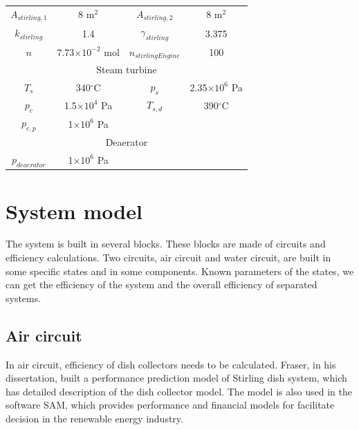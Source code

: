 \documentclass{article}
\begin{document}
\begin{table}[htbp]
\begin{center}
\begin{tabular}{cccc}
		$A_{stirling,1}$\nomenclature{$A_{stirling,1}$}{Heat transfer area of Stirling engine at air side, m$^2$} & 8 m$^2$ & $A_{stirling,2}$\nomenclature{$A_{stirling,2}$}{Heat transfer area of Stirling engine at water side, m$^2$} & 8 m$^2$\\
		$k_{stirling}$\nomenclature{$k_{stirling}$}{Specific heat ratio of the working gas in Stirling engine} & 1.4 & $\gamma_{stirling}$\nomenclature[G]{$\gamma_{stirling}$}{Compression ratio of Stirling engine} & 3.375\\
		$n$\nomenclature{$n$}{Amount of working gas in each Stirling engine, mol} & 7.73$\times{}10^{-2}$ mol & $n_{stirlingEngine}$\nomenclature{$n_{stirlingEngine}$}{Number of Stirling engines in the Stirling engine array} & 100\\
		\midrule
		\multicolumn{4}{c}{Steam turbine}\\
		\midrule
		$T_s$\nomenclature{$T_s$}{Main steam temperature of turbine} & 340$^\circ$C & $p_s$\nomenclature{$p_s$}{Main steam pressure of turbine, Pa} & 2.35$\times10^6$ Pa\\
		$p_c$\nomenclature{$p_c$}{Exhaust pressure of turbine, Pa} & 1.5$\times10^4$ Pa & $T_{s,d}$\nomenclature{$T_{s,d}$}{Designed mean steam temperature of turbine} & 390$^\circ$C\\
		$p_{c,p}$\nomenclature{$p_{cp}$}{Water pressure after condensate pump, Pa} & 1$\times10^6$ Pa\\
		\midrule
		\multicolumn{4}{c}{Deaerator}\\
		\midrule
		$p_{deaerator}$\nomenclature{$p_{deaerator}$}{Outlet pressure of deaerator, Pa} & 1$\times10^6$ Pa\\
		\bottomrule
	\end{tabular}
	\end{center}
	\label{tab:system-data}
\end{table}

\section{System model}
The system is built in several blocks. These blocks are made of circuits and efficiency calculations. Two circuits, air circuit and water circuit, are built in some specific states and in some components. Known parameters of the states, we can get the efficiency of the system and the overall efficiency of separated systems.

\subsection{Air circuit}
In air circuit, efficiency of dish collectors needs to be calculated. Fraser, in his dissertation\cite{Fraser2008}, built a performance prediction model of Stirling dish system, which has detailed description of the dish collector model. The model is also used in the software SAM, which provides performance and financial models for facilitate decision in the renewable energy industry.
\end{document}
